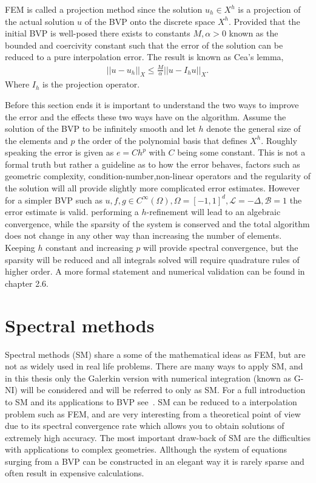 FEM is called a projection method since the solution $u_h\in X^h$ is a projection
of the actual solution $u$ of the BVP onto the discrete space $X^h$. Provided that the initial BVP is well-posed there exists to 
constants $M,\alpha>0$ known as the bounded and coercivity constant such that the error of the solution can be reduced to a pure 
interpolation error. The result is known as Cea's lemma,  
\begin{align}
    ||u-u_h||_X \leq \frac{M}{\alpha}||u-I_hu||_X.
    \label{eq:Cea}
\end{align}
Where $I_h$ is the projection operator. 

Before this section ends it is important to understand the two ways to improve the error and the effects these two ways have on the algorithm. 
Assume the solution of the BVP to be infinitely smooth and let $h$ denote the general size of the elements
and $p$ the order of the polynomial basis that defines $X^h$. Roughly speaking the error is given as $e = Ch^p$ with $C$ being some constant.
This is not a formal truth but rather a guideline as to how the error behaves, factors such as geometric complexity, condition-number,non-linear
operators and the regularity of the solution will all provide slightly more complicated error estimates. 
However for a simpler BVP such as $u,f,g \in C^{\infty}(\Omega), \Omega = [-1,1]^d, \mathcal{L} = -\Delta,\mathcal{B} = 1$ the error estimate is valid.  
performing a $h$-refinement will lead to an algebraic convergence, while the sparsity of the system is conserved
and the total algorithm does not change in any other way than increasing the number of elements.
Keeping $h$ constant and increasing $p$ will provide spectral convergence, but the sparsity will be reduced and all integrals solved will require 
quadrature rules of higher order. A more formal statement and numerical validation can be found in \cite{Karniadakis} chapter 2.6.  

\section{Spectral methods}
Spectral methods (SM) share a some of the mathematical ideas as FEM, but are not as widely used in real life problems. 
There are many ways to apply SM, 
and in this thesis only the Galerkin version with numerical integration (known as G-NI) will be considered and will be referred to only as SM. 
For a full introduction to SM and its applications to BVP see~\cite{Canuto}.
SM can be reduced to a interpolation problem such as FEM, and are very interesting from a theoretical point of view due to its 
spectral convergence rate which allows you to obtain solutions of extremely high accuracy. 
The most important draw-back of SM are the difficulties with applications to complex geometries. Allthough the system of equations surging from
a BVP can be constructed in an elegant way it is rarely sparse and often result in expensive calculations. 


